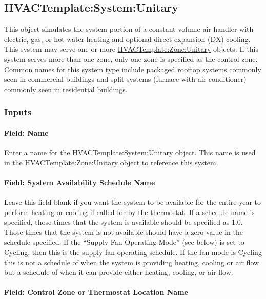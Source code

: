 \subsection{HVACTemplate:System:Unitary}\label{hvactemplatesystemunitary}

This object simulates the system portion of a constant volume air handler with electric, gas, or hot water heating and optional direct-expansion (DX) cooling. This system may serve one or more \hyperref[hvactemplatezoneunitary]{HVACTemplate:Zone:Unitary} objects. If this system serves more than one zone, only one zone is specified as the control zone. Common names for this system type include packaged rooftop systems commonly seen in commercial buildings and split systems (furnace with air conditioner) commonly seen in residential buildings.

\subsubsection{Inputs}\label{inputs-15-005}

\paragraph{Field: Name}\label{field-name-2-019}

Enter a name for the HVACTemplate:System:Unitary object. This name is used in the \hyperref[hvactemplatezoneunitary]{HVACTemplate:Zone:Unitary} object to reference this system.

\paragraph{Field: System Availability Schedule Name}\label{field-system-availability-schedule-name-7}

Leave this field blank if you want the system to be available for the entire year to perform heating or cooling if called for by the thermostat. If a schedule name is specified, those times that the system is available should be specified as 1.0. Those times that the system is not available should have a zero value in the schedule specified. If the ``Supply Fan Operating Mode'' (see below) is set to Cycling, then this is the supply fan operating schedule. If the fan mode is Cycling this is not a schedule of when the system is providing heating, cooling or air flow but a schedule of when it can provide either heating, cooling, or air flow.

\paragraph{Field: Control Zone or Thermostat Location Name}\label{field-control-zone-or-thermostat-location-name}

